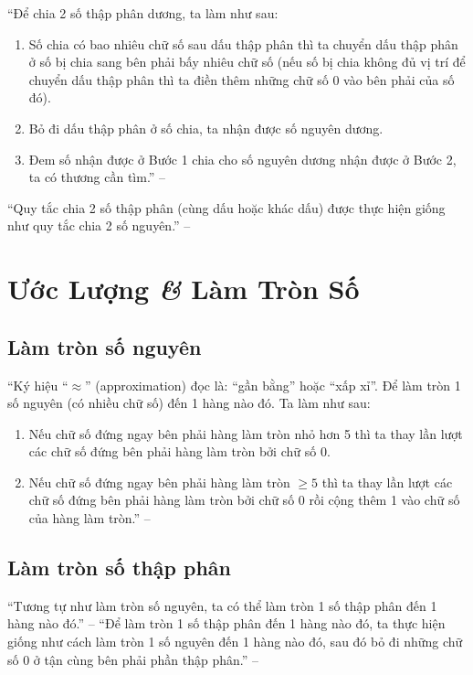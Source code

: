 \documentclass[oneside]{book}
\numberwithin{equation}{section}
\begin{document}
``Để chia 2 số thập phân dương, ta làm như sau:
\begin{enumerate}
	\item Số chia có bao nhiêu chữ số sau dấu thập phân thì ta chuyển dấu thập phân ở số bị chia sang bên phải bấy nhiêu chữ số (nếu số bị chia không đủ vị trí để chuyển dấu thập phân thì ta điền thêm những chữ số 0 vào bên phải của số đó).
	\item Bỏ đi dấu thập phân ở số chia, ta nhận được số nguyên dương.
	\item Đem số nhận được ở Bước 1 chia cho số nguyên dương nhận được ở Bước 2, ta có thương cần tìm.'' -- \cite[p. 54]{Thai_Anh_Dat_Ha_Loan_Nam_Quang_Toan_6_tap_2}
\end{enumerate}
``Quy tắc chia 2 số thập phân (cùng dấu hoặc khác dấu) được thực hiện giống như quy tắc chia 2 số nguyên.'' -- \cite[p. 55]{Thai_Anh_Dat_Ha_Loan_Nam_Quang_Toan_6_tap_2}


\section{Ước Lượng \textit{\&} Làm Tròn Số}

\subsection{Làm tròn số nguyên}
``Ký hiệu ``$\approx$'' (approximation) đọc là: ``gần bằng'' hoặc ``xấp xỉ''. Để làm tròn 1 số nguyên (có nhiều chữ số) đến 1 hàng nào đó. Ta làm như sau:
\begin{enumerate}
	\item Nếu chữ số đứng ngay bên phải hàng làm tròn nhỏ hơn 5 thì ta thay lần lượt các chữ số đứng bên phải hàng làm tròn bởi chữ số 0.
	\item Nếu chữ số đứng ngay bên phải hàng làm tròn $\ge 5$ thì ta thay lần lượt các chữ số đứng bên phải hàng làm tròn bởi chữ số 0 rồi cộng thêm 1 vào chữ số của hàng làm tròn.'' -- \cite[p. 58]{Thai_Anh_Dat_Ha_Loan_Nam_Quang_Toan_6_tap_2}
\end{enumerate}

\subsection{Làm tròn số thập phân}
``Tương tự như làm tròn số nguyên, ta có thể làm tròn 1 số thập phân đến 1 hàng nào đó.'' -- \cite[p. 58]{Thai_Anh_Dat_Ha_Loan_Nam_Quang_Toan_6_tap_2} ``Để làm tròn 1 số thập phân đến 1 hàng nào đó, ta thực hiện giống như cách làm tròn 1 số nguyên đến 1 hàng nào đó, sau đó bỏ đi những chữ số 0 ở tận cùng bên phải phần thập phân.'' -- \cite[p. 59]{Thai_Anh_Dat_Ha_Loan_Nam_Quang_Toan_6_tap_2}
\end{document}
